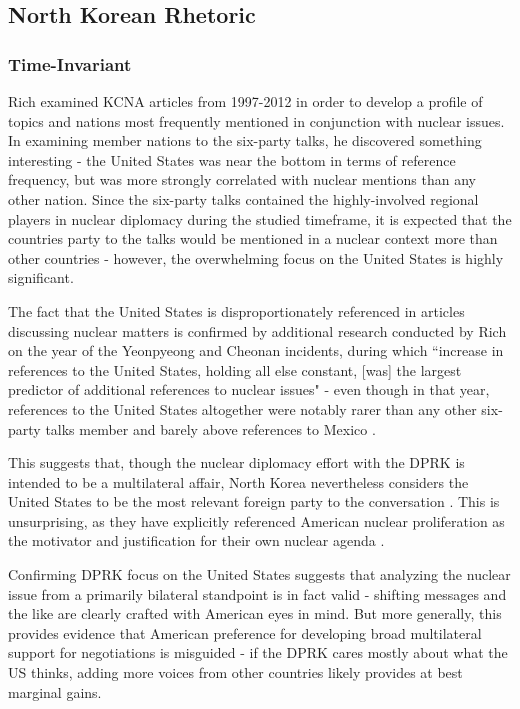 \documentclass{article}
\begin{document}
\subsection{North Korean Rhetoric}
\subsubsection{Time-Invariant}
Rich \cite{rich14} examined KCNA articles from 1997-2012 in order to develop a profile of topics and nations most frequently mentioned in conjunction with nuclear issues. In examining member nations to the six-party talks, he discovered something interesting -  the United States was near the bottom in terms of reference frequency, but was more strongly correlated with nuclear mentions than any other nation. Since the six-party talks contained the highly-involved regional players in nuclear diplomacy during the studied timeframe, it is expected that the countries party to the talks would be mentioned in a nuclear context more than other countries - however, the overwhelming focus on the United States is highly significant.

The fact that the United States is disproportionately referenced in articles discussing nuclear matters is confirmed by additional research conducted by Rich on the year of the Yeonpyeong and Cheonan incidents, during which ``increase in references to the United States, holding all else constant, [was] the largest predictor of additional references to nuclear issues" - even though in that year, references to the United States altogether were notably rarer than any other six-party talks member and barely above references to Mexico \cite{rich12}.

This suggests that, though the nuclear diplomacy effort with the DPRK is intended to be a multilateral affair, North Korea nevertheless considers the United States to be the most relevant foreign party to the conversation \cite{rich14}. This is unsurprising, as they have explicitly referenced American nuclear proliferation as the motivator and justification for their own nuclear agenda \cite{kcna, kcna3, kcna4}.

Confirming DPRK focus on the United States suggests that analyzing the nuclear issue from a primarily bilateral standpoint is in fact valid - shifting messages and the like are clearly crafted with American eyes in mind. But more generally, this provides evidence that American preference for developing broad multilateral support for negotiations is misguided - if the DPRK cares mostly about what the US thinks, adding more voices from other countries likely provides at best marginal gains.
\end{document}
